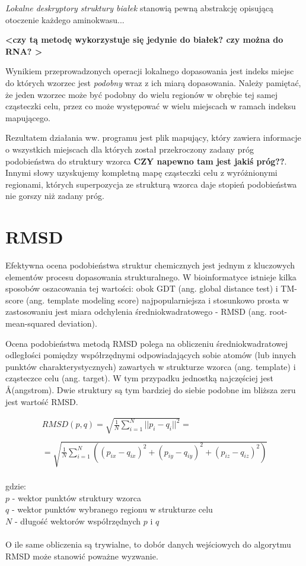 \documentclass[licencjacka]{pracamgr}
\begin{document}
\textit{Lokalne deskryptory struktury białek} stanowią pewną abstrakcję opisującą otoczenie każdego aminokwasu... 

\textbf{<czy tą metodę wykorzystuje się jedynie do białek? czy można do RNA? >}

Wynikiem przeprowadzonych operacji lokalnego dopasowania jest indeks miejsc do których wzorzec jest \textit{podobny} wraz z ich miarą dopasowania. Należy pamiętać, że jeden wzorzec może być podobny do wielu regionów w obrębie tej samej cząsteczki celu, przez co może występować w wielu miejscach w ramach indeksu mapującego.

Rezultatem działania ww. programu jest plik mapujący, który zawiera informacje o wszystkich miejscach dla których został przekroczony zadany próg podobieństwa do struktury wzorca \textbf{CZY napewno tam jest jakiś próg??}. Innymi słowy uzyskujemy kompletną mapę cząsteczki celu z wyróżnionymi regionami, których superpozycja ze strukturą wzorca daje stopień podobieństwa nie gorszy niż zadany próg.


\section{RMSD}
Efektywna ocena podobieństwa struktur chemicznych jest jednym z kluczowych elementów procesu dopasowania strukturalnego. W bioinformatyce istnieje kilka sposobów oszacowania tej wartości: obok GDT (ang. global distance test) i TM-score (ang. template modeling score) najpopularniejsza i stosunkowo prosta w zastosowaniu jest miara odchylenia średniokwadratowego - RMSD (ang. root-mean-squared deviation). 

Ocena podobieństwa metodą RMSD polega na obliczeniu średniokwadratowej odległości pomiędzy współrzędnymi odpowiadających sobie atomów (lub innych punktów charakterystycznych) zawartych w strukturze wzorca (ang. template) i cząsteczce celu (ang. target). W tym przypadku jednostką najczęściej jest \AA (angstrom). Dwie struktury są tym bardziej do siebie podobne im bliższa zeru jest wartość RMSD.

$$
\begin{array}{lr}
RMSD(p,q) = \sqrt{\frac{1}{N}\sum_{i=1}^{N}||p_i-q_i||^{2}} = \\
\\
= \sqrt{\frac{1}{N}\sum_{i=1}^{N}((p_{ix}-q_{ix})^{2}+(p_{iy}-q_{iy})^{2}+(p_{iz}-q_{iz})^{2})}
\end{array}
$$
\\
gdzie:
\\
$p$ - wektor punktów struktury wzorca
\\
$q$ - wektor punktów wybranego regionu w strukturze celu
\\
$N$ - długość wektorów współrzędnych $p$ i $q$
\\
\\
O ile same obliczenia są trywialne, to dobór danych wejściowych do algorytmu RMSD może stanowić poważne wyzwanie. 
\end{document}
